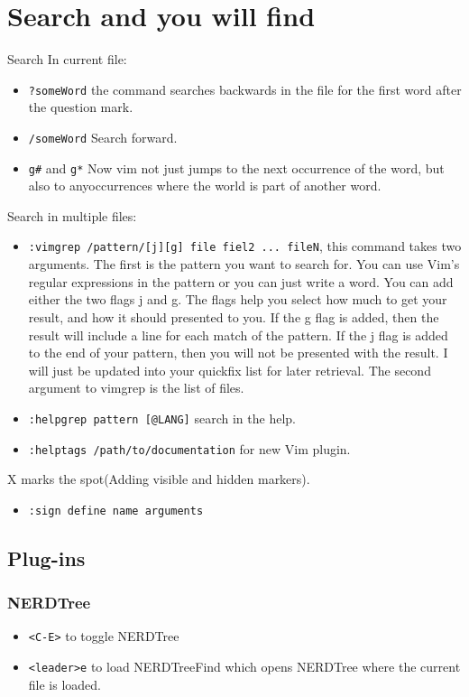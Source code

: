 \documentclass[11pt]{book}
\begin{document}
 \chapter{Search and you will find}
 Search In current file:
 \begin{itemize}
 \item \verb|?someWord| the command searches backwards in the file for the first
 word after the question mark.
 \item \verb|/someWord| Search forward.
 \item \verb|g#| and \verb|g*| Now vim not just jumps to the next occurrence of
 the word, but also to anyoccurrences where the world is part of another word.
 \end{itemize}
 Search in multiple files:
 \begin{itemize}
 \item \verb|:vimgrep /pattern/[j][g] file fiel2 ... fileN|, this command takes
 two arguments. The first is the pattern you want to search for. You can use
 Vim's regular expressions in the pattern or you can just write a word. You can
 add either the two flags j and g. The flags help you select how much to get
 your result, and how it should presented to you. If the g flag is added, then
 the result will include a line for each match of the pattern. If the j flag is
 added to the end of your pattern, then you will not be presented with the
 result. I will just be updated into your quickfix list for later retrieval. The
 second argument to vimgrep is the list of files.
 \item \verb|:helpgrep pattern [@LANG]| search in the help.
 \item \verb|:helptags /path/to/documentation| for new Vim plugin.
 \end{itemize}
 X marks the spot(Adding visible and hidden markers).
 \begin{itemize}
 \item \verb|:sign define name arguments|
 \end{itemize}
 \section{Plug-ins}
 \subsection{NERDTree}
 \begin{itemize}
        \item \verb|<C-E>| to toggle NERDTree
        \item \verb|<leader>e| to load NERDTreeFind which opens NERDTree where 
             the current file is loaded.
 \end{itemize}
\end{document}
